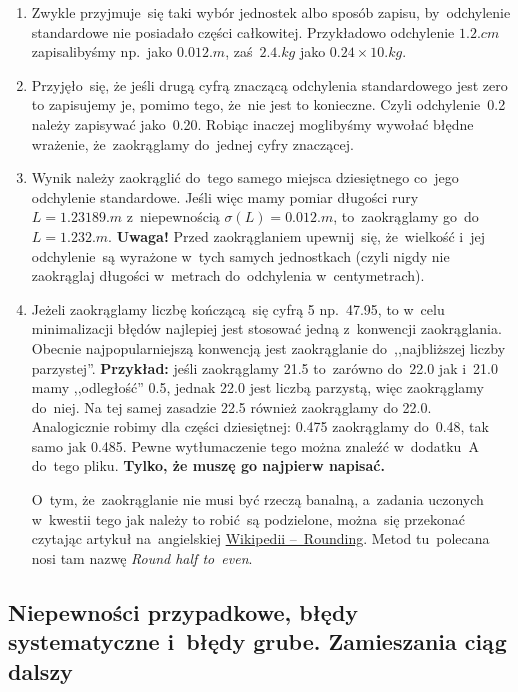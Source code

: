 \documentclass[a4paper,11pt]{article}
\newcommand{\tb}{\textbf}
\begin{document}
\begin{enumerate}
\begin{figure}[h]
    \label{fig:odchylenie}
  \end{figure}
\item Zwykle przyjmuje~się taki wybór jednostek albo sposób zapisu,
  by~odchylenie standardowe nie posiadało części całkowitej.
  Przykładowo odchylenie $1.2 \si{.cm}$ zapisalibyśmy np.~jako
  $0.012 \si{.m}$, zaś~$2.4 \si{.kg}$ jako $0.24 \times 10 \si{.kg}$.
\item Przyjęło~się, że jeśli drugą cyfrą znaczącą odchylenia
  standardowego jest zero to zapisujemy je, pomimo tego, że~nie jest
  to konieczne. Czyli odchylenie~0.2 należy zapisywać jako~0.20.
  Robiąc inaczej moglibyśmy wywołać błędne wrażenie, że~zaokrąglamy
  do~jednej cyfry znaczącej.
\item Wynik należy zaokrąglić do~tego samego miejsca dziesiętnego
  co~jego odchylenie standardowe. Jeśli więc mamy pomiar długości rury
  $L = 1.23189 \si{.m}$ z~niepewnością $\sigma( L ) = 0.012 \si{.m}$,
  to~zaokrąglamy go~do~$L = 1.232 \si{.m}$. \tb{Uwaga!} Przed
  zaokrąglaniem upewnij~się, że~wielkość i~jej odchylenie~są wyrażone
  w~tych samych jednostkach (czyli nigdy nie zaokrąglaj długości
  w~metrach do~odchylenia w~centymetrach).
\item Jeżeli zaokrąglamy liczbę kończącą~się cyfrą 5 np.~47.95, to
  w~celu minimalizacji błędów najlepiej jest stosować jedną
  z~konwencji zaokrąglania. Obecnie najpopularniejszą konwencją jest
  zaokrąglanie do~,,najbliższej liczby parzystej''. \tb{Przykład:}
  jeśli zaokrąglamy 21.5 to~zarówno do~22.0 jak i~21.0 mamy
  ,,odległość'' 0.5, jednak 22.0 jest liczbą parzystą, więc
  zaokrąglamy do~niej. Na tej samej zasadzie 22.5 również zaokrąglamy
  do 22.0. Analogicznie robimy dla części dziesiętnej: 0.475
  zaokrąglamy do~0.48, tak samo jak 0.485. Pewne wytłumaczenie tego
  można znaleźć w~dodatku~A do~tego pliku. \tb{Tylko, że muszę go
    najpierw napisać.}

  O~tym, że~zaokrąglanie nie musi być rzeczą banalną, a~zadania
  uczonych w~kwestii tego jak należy to robić~są podzielone, można~się
  przekonać czytając artykuł na~angielskiej
  \href{https://en.wikipedia.org/wiki/Rounding}{Wikipedii
    --~Rounding}. Metod tu~polecana nosi tam nazwę \emph{Round half
    to~even}.
\end{enumerate}





\subsection{Niepewności przypadkowe, błędy systematyczne i~błędy
  grube. Zamieszania ciąg dalszy}
\label{sec:niepewnosci}
\end{document}
